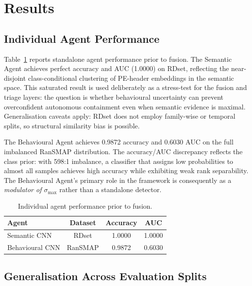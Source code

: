 \section{Results}
\label{sec:eswa_results}

\subsection{Individual Agent Performance}

Table~\ref{tab:eswa_agents} reports standalone agent performance prior to fusion. The Semantic Agent achieves perfect accuracy and AUC (1.0000) on RDset, reflecting the near-disjoint class-conditional clustering of PE-header embeddings in the semantic space. This saturated result is used deliberately as a stress-test for the fusion and triage layers: the question is whether behavioural uncertainty can prevent overconfident autonomous containment even when semantic evidence is maximal. Generalisation caveats apply: RDset does not employ family-wise or temporal splits, so structural similarity bias is possible.

The Behavioural Agent achieves 0.9872 accuracy and 0.6030 AUC on the full imbalanced RanSMAP distribution. The accuracy/AUC discrepancy reflects the class prior: with 598:1 imbalance, a classifier that assigns low probabilities to almost all samples achieves high accuracy while exhibiting weak rank separability. The Behavioural Agent's primary role in the framework is consequently as a \emph{modulator of $\sigma_\text{max}$} rather than a standalone detector.

\begin{table}[ht]
\centering
\caption{Individual agent performance prior to fusion.}
\label{tab:eswa_agents}
\begin{tabular}{lccc}
\toprule
\textbf{Agent} & \textbf{Dataset} & \textbf{Accuracy} & \textbf{AUC} \\
\midrule
Semantic CNN    & RDset   & 1.0000 & 1.0000 \\
Behavioural CNN & RanSMAP & 0.9872 & 0.6030 \\
\bottomrule
\end{tabular}
\end{table}

\subsection{Generalisation Across Evaluation Splits}
\label{sec:eswa_generalisation}

